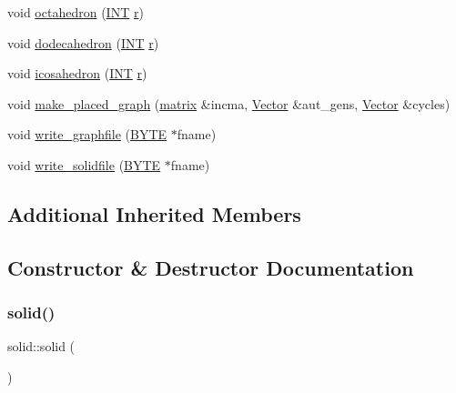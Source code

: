 \begin{DoxyCompactItemize}
void \mbox{\hyperlink{classsolid_a9c1c4015737b992fc935a05e6748f824}{octahedron}} (\mbox{\hyperlink{galois_8h_a09fddde158a3a20bd2dcadb609de11dc}{I\+NT}} \mbox{\hyperlink{alphabet2_8_c_acab531abaa74a7e664e3986f2522b33a}{r}})
\item 
void \mbox{\hyperlink{classsolid_a514072d4dfd0f82ba24b0df1ac302d6f}{dodecahedron}} (\mbox{\hyperlink{galois_8h_a09fddde158a3a20bd2dcadb609de11dc}{I\+NT}} \mbox{\hyperlink{alphabet2_8_c_acab531abaa74a7e664e3986f2522b33a}{r}})
\item 
void \mbox{\hyperlink{classsolid_a70240006a1198bfeebac8d11923ee372}{icosahedron}} (\mbox{\hyperlink{galois_8h_a09fddde158a3a20bd2dcadb609de11dc}{I\+NT}} \mbox{\hyperlink{alphabet2_8_c_acab531abaa74a7e664e3986f2522b33a}{r}})
\item 
void \mbox{\hyperlink{classsolid_a67a153cfb0673d8b90e81cb45064626c}{make\+\_\+placed\+\_\+graph}} (\mbox{\hyperlink{classmatrix}{matrix}} \&incma, \mbox{\hyperlink{class_vector}{Vector}} \&aut\+\_\+gens, \mbox{\hyperlink{class_vector}{Vector}} \&cycles)
\item 
void \mbox{\hyperlink{classsolid_ab21f3d7cb562fa9ce61b1a1cb2e5a411}{write\+\_\+graphfile}} (\mbox{\hyperlink{galois_8h_ab6cc7b4aeb6ea31aba2b3fbfc83ff5e6}{B\+Y\+TE}} $\ast$fname)
\item 
void \mbox{\hyperlink{classsolid_a60865c3210ff835fe2bd528f2396686d}{write\+\_\+solidfile}} (\mbox{\hyperlink{galois_8h_ab6cc7b4aeb6ea31aba2b3fbfc83ff5e6}{B\+Y\+TE}} $\ast$fname)
\end{DoxyCompactItemize}
\subsection*{Additional Inherited Members}


\subsection{Constructor \& Destructor Documentation}
\mbox{\label{classsolid_a27e2f13966fd3b10b34b42c07b3a0e90}} 
\subsubsection{\texorpdfstring{solid()}{solid()}\hspace{0.1cm}{\footnotesize\ttfamily [1/2]}}
{\footnotesize\ttfamily solid\+::solid (\begin{DoxyParamCaption}{ }\end{DoxyParamCaption})}

